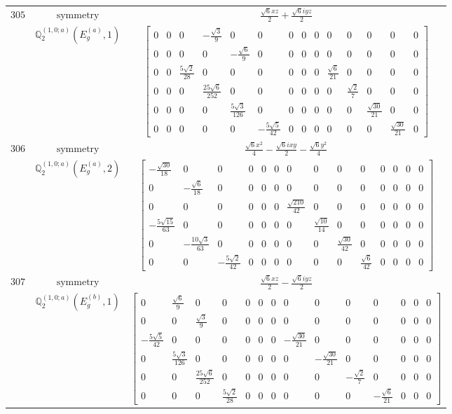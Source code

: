 \documentclass[fleqn,8pt,landscape]{jsarticle}
\begin{document}
\begin{longtable}{ccc}
$ 305 $ & $ \text{symmetry} $ & $ \frac{\sqrt{6} x z}{2} + \frac{\sqrt{6} i y z}{2} $ \\
$  $ & $ \mathbb{Q}_{2}^{(1,0;a)}(E_{g}^{(a)},1) $ & $ \begin{bmatrix} 0 & 0 & 0 & - \frac{\sqrt{3}}{9} & 0 & 0 & 0 & 0 & 0 & 0 & 0 & 0 & 0 & 0 \\ 0 & 0 & 0 & 0 & - \frac{\sqrt{6}}{9} & 0 & 0 & 0 & 0 & 0 & 0 & 0 & 0 & 0 \\ 0 & 0 & \frac{5 \sqrt{2}}{28} & 0 & 0 & 0 & 0 & 0 & 0 & \frac{\sqrt{6}}{21} & 0 & 0 & 0 & 0 \\ 0 & 0 & 0 & \frac{25 \sqrt{6}}{252} & 0 & 0 & 0 & 0 & 0 & 0 & \frac{\sqrt{2}}{7} & 0 & 0 & 0 \\ 0 & 0 & 0 & 0 & \frac{5 \sqrt{3}}{126} & 0 & 0 & 0 & 0 & 0 & 0 & \frac{\sqrt{30}}{21} & 0 & 0 \\ 0 & 0 & 0 & 0 & 0 & - \frac{5 \sqrt{5}}{42} & 0 & 0 & 0 & 0 & 0 & 0 & \frac{\sqrt{30}}{21} & 0 \end{bmatrix} $ \\ \hline
$ 306 $ & $ \text{symmetry} $ & $ \frac{\sqrt{6} x^{2}}{4} - \frac{\sqrt{6} i x y}{2} - \frac{\sqrt{6} y^{2}}{4} $ \\
$  $ & $ \mathbb{Q}_{2}^{(1,0;a)}(E_{g}^{(a)},2) $ & $ \begin{bmatrix} - \frac{\sqrt{30}}{18} & 0 & 0 & 0 & 0 & 0 & 0 & 0 & 0 & 0 & 0 & 0 & 0 & 0 \\ 0 & - \frac{\sqrt{6}}{18} & 0 & 0 & 0 & 0 & 0 & 0 & 0 & 0 & 0 & 0 & 0 & 0 \\ 0 & 0 & 0 & 0 & 0 & 0 & \frac{\sqrt{210}}{42} & 0 & 0 & 0 & 0 & 0 & 0 & 0 \\ - \frac{5 \sqrt{15}}{63} & 0 & 0 & 0 & 0 & 0 & 0 & \frac{\sqrt{10}}{14} & 0 & 0 & 0 & 0 & 0 & 0 \\ 0 & - \frac{10 \sqrt{3}}{63} & 0 & 0 & 0 & 0 & 0 & 0 & \frac{\sqrt{30}}{42} & 0 & 0 & 0 & 0 & 0 \\ 0 & 0 & - \frac{5 \sqrt{2}}{42} & 0 & 0 & 0 & 0 & 0 & 0 & \frac{\sqrt{6}}{42} & 0 & 0 & 0 & 0 \end{bmatrix} $ \\ \hline
$ 307 $ & $ \text{symmetry} $ & $ \frac{\sqrt{6} x z}{2} - \frac{\sqrt{6} i y z}{2} $ \\
$  $ & $ \mathbb{Q}_{2}^{(1,0;a)}(E_{g}^{(b)},1) $ & $ \begin{bmatrix} 0 & \frac{\sqrt{6}}{9} & 0 & 0 & 0 & 0 & 0 & 0 & 0 & 0 & 0 & 0 & 0 & 0 \\ 0 & 0 & \frac{\sqrt{3}}{9} & 0 & 0 & 0 & 0 & 0 & 0 & 0 & 0 & 0 & 0 & 0 \\ - \frac{5 \sqrt{5}}{42} & 0 & 0 & 0 & 0 & 0 & 0 & - \frac{\sqrt{30}}{21} & 0 & 0 & 0 & 0 & 0 & 0 \\ 0 & \frac{5 \sqrt{3}}{126} & 0 & 0 & 0 & 0 & 0 & 0 & - \frac{\sqrt{30}}{21} & 0 & 0 & 0 & 0 & 0 \\ 0 & 0 & \frac{25 \sqrt{6}}{252} & 0 & 0 & 0 & 0 & 0 & 0 & - \frac{\sqrt{2}}{7} & 0 & 0 & 0 & 0 \\ 0 & 0 & 0 & \frac{5 \sqrt{2}}{28} & 0 & 0 & 0 & 0 & 0 & 0 & - \frac{\sqrt{6}}{21} & 0 & 0 & 0 \end{bmatrix} $ \\ \hline

\end{longtable}
\end{document}
